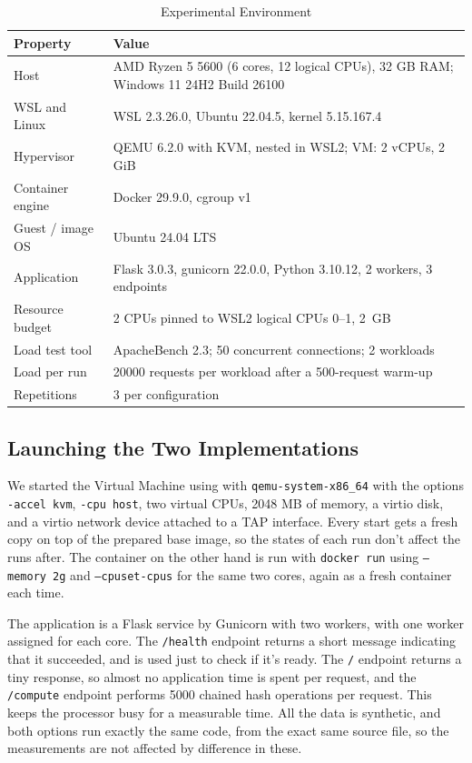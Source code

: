 \documentclass[conference,a4paper]{IEEEtran}
\begin{document}
\begin{table}[htbp]
	\caption{Experimental Environment}
	\begin{center}
		\footnotesize
		\begin{tabular}{|p{}|p{}|}
			\hline
			\textbf{Property} & \textbf{Value} \\
			\hline
			Host & AMD Ryzen 5 5600 (6 cores, 12 logical CPUs), 32 GB RAM; Windows 11 24H2 Build 26100 \\
			\hline
			WSL and Linux & WSL 2.3.26.0, Ubuntu 22.04.5, kernel 5.15.167.4 \\
			\hline
			Hypervisor & QEMU 6.2.0 with KVM, nested in WSL2; VM: 2 vCPUs, 2 GiB \\
			\hline
			Container engine & Docker 29.9.0, cgroup v1 \\
			\hline
			Guest / image OS & Ubuntu 24.04 LTS \\
			\hline
			Application & Flask 3.0.3, gunicorn 22.0.0, Python 3.10.12, 2 workers, 3 endpoints \\
			\hline
			Resource budget & 2 CPUs pinned to WSL2 logical CPUs 0--1, 2~GB \\
			\hline
			Load test tool & ApacheBench 2.3; 50 concurrent connections; 2 workloads \\
			\hline
			Load per run & 20000 requests per workload after a 500-request warm-up \\
			\hline
			Repetitions & 3 per configuration \\
			\hline
		\end{tabular}
		\label{tab:environment}
	\end{center}
\end{table}

\subsection{Launching the Two Implementations}
We started the Virtual Machine using with \texttt{qemu-system-x86\_64} with the options \texttt{-accel kvm}, \texttt{-cpu host}, two virtual CPUs, 2048 MB of memory, a virtio disk, and a virtio network device attached to a TAP interface. Every start gets a fresh copy on top of the prepared base image, so the states of each run don’t affect the runs after. The container on the other hand is run with \texttt{docker run} using \texttt{--memory 2g} and \texttt{--cpuset-cpus} for the same two cores, again as a fresh container each time.

The application is a Flask service by Gunicorn with two workers, with one worker assigned for each core. The \texttt{/health} endpoint returns a short message indicating that it succeeded, and is used just to check if it’s ready. The \texttt{/} endpoint returns a tiny response, so almost no application time is spent per request, and the \texttt{/compute} endpoint performs 5000 chained hash operations per request. This keeps the processor busy for a measurable time. All the data is synthetic, and both options run exactly the same code, from the exact same source file, so the measurements are not affected by difference in these.
\end{document}
